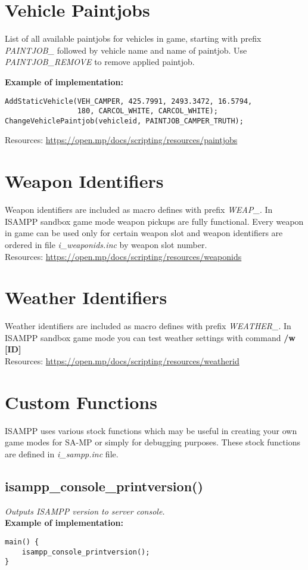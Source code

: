 \documentclass{article}
\begin{document}
\section{Vehicle Paintjobs}
\begin{sloppypar}
List of all available paintjobs for vehicles in game, starting with prefix \textit{PAINTJOB\_} followed by vehicle name and name of paintjob. Use \textit{PAINTJOB\_REMOVE} to remove applied paintjob.
\end{sloppypar}
\bigskip
\noindent \textbf{Example of implementation:}
\begin{verbatim}
AddStaticVehicle(VEH_CAMPER, 425.7991, 2493.3472, 16.5794,
                 180, CARCOL_WHITE, CARCOL_WHITE);
ChangeVehiclePaintjob(vehicleid, PAINTJOB_CAMPER_TRUTH);
\end{verbatim}
\bigskip
Resources: \url{https://open.mp/docs/scripting/resources/paintjobs}


\section{Weapon Identifiers}
Weapon identifiers are included as macro defines with prefix \textit{WEAP\_}. In ISAMPP sandbox game mode weapon pickups are fully functional. Every weapon in game can be used only for certain weapon slot and weapon identifiers are ordered in file \textit{i\_weaponids.inc} by weapon slot number.
\bigskip
\\Resources: \url{https://open.mp/docs/scripting/resources/weaponids}


\section{Weather Identifiers}
Weather identifiers are included as macro defines with prefix \textit{WEATHER\_}. In ISAMPP sandbox game mode you can test weather settings with command \textbf{/w [ID]}
\bigskip
\\Resources: \url{https://open.mp/docs/scripting/resources/weatherid}


\newpage
\section{Custom Functions}

ISAMPP uses various stock functions which may be useful in creating your own game modes for SA-MP or simply for debugging purposes. These stock functions are defined in \textit{i\_sampp.inc} file.

\subsection{isampp\_console\_printversion()}
\textit{Outputs ISAMPP version to server console.}
\bigskip
\\\textbf{Example of implementation:}
\begin{verbatim}
main() {
    isampp_console_printversion();
}
\end{verbatim}
\end{document}
